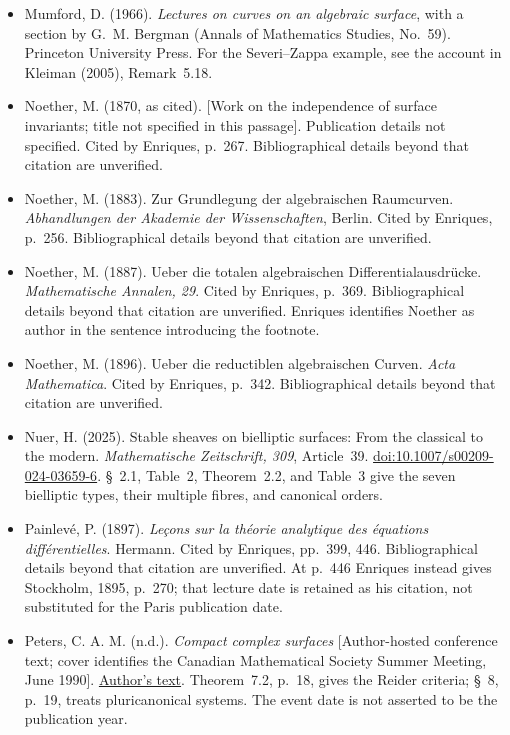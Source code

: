 \begin{sloppypar}
\begin{itemize}
\item Mumford, D. (1966). \emph{Lectures on curves on an algebraic surface}, with a section by G.~M. Bergman (Annals of Mathematics Studies, No.~59). Princeton University Press. For the Severi--Zappa example, see the account in Kleiman (2005), Remark~5.18.

\item Noether, M. (1870, as cited). [Work on the independence of surface invariants; title not specified in this passage]. Publication details not specified. Cited by Enriques, p.~267. Bibliographical details beyond that citation are unverified.

\item Noether, M. (1883). Zur Grundlegung der algebraischen Raumcurven. \emph{Abhandlungen der Akademie der Wissenschaften}, Berlin. Cited by Enriques, p.~256. Bibliographical details beyond that citation are unverified.

\item Noether, M. (1887). Ueber die totalen algebraischen Differentialausdrücke. \emph{Mathematische Annalen, 29}. Cited by Enriques, p.~369. Bibliographical details beyond that citation are unverified. Enriques identifies Noether as author in the sentence introducing the footnote.

\item Noether, M. (1896). Ueber die reductiblen algebraischen Curven. \emph{Acta Mathematica}. Cited by Enriques, p.~342. Bibliographical details beyond that citation are unverified.

\item Nuer, H. (2025). Stable sheaves on bielliptic surfaces: From the classical to the modern. \emph{Mathematische Zeitschrift, 309}, Article~39. \href{https://doi.org/10.1007/s00209-024-03659-6}{doi:10.1007/s00209-024-03659-6}. \S~2.1, Table~2, Theorem~2.2, and Table~3 give the seven bielliptic types, their multiple fibres, and canonical orders.

\item Painlevé, P. (1897). \emph{Leçons sur la théorie analytique des équations différentielles}. Hermann. Cited by Enriques, pp.~399, 446. Bibliographical details beyond that citation are unverified. At p.~446 Enriques instead gives Stockholm, 1895, p.~270; that lecture date is retained as his citation, not substituted for the Paris publication date.

\item Peters, C. A. M. (n.d.). \emph{Compact complex surfaces} [Author-hosted conference text; cover identifies the Canadian Mathematical Society Summer Meeting, June 1990]. \href{https://cpeters1.win.tue.nl/ConfsAndSchools/Canada/surface.pdf}{Author's text}. Theorem~7.2, p.~18, gives the Reider criteria; \S~8, p.~19, treats pluricanonical systems. The event date is not asserted to be the publication year.


\end{itemize}
\end{sloppypar}
